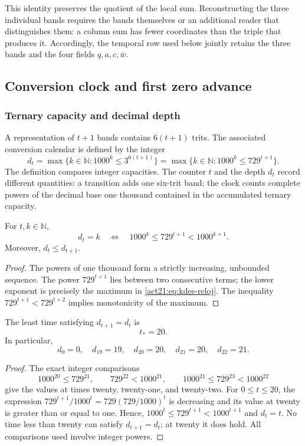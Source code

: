 This identity preserves the quotient of the local sum. Reconstructing
the three individual bands requires the bands themselves or an additional reader
that distinguishes them: a column sum has fewer coordinates
than the triple that produces it. Accordingly, the temporal row used below
jointly retains the three bands and the four fields
$q,a,c,\bar w$.

\subsection{Conversion clock and first zero advance}

\subsubsection{Ternary capacity and decimal depth}

A representation of $t+1$ bands contains $6(t+1)$ trits. The associated
conversion calendar is defined by the integer
\begin{equation}
 d_t=\max\{k\in\mathbb N:1000^k\leq3^{6(t+1)}\}
     =\max\{k\in\mathbb N:1000^k\leq729^{t+1}\}.
 \label{act21:eq:kdes-reloj}
\end{equation}
The definition compares integer capacities. The counter $t$ and the
depth $d_t$ record different quantities: a transition adds
one six-trit band; the clock counts complete powers of the
decimal base one thousand contained in the accumulated ternary capacity.

\begin{lemma}
For $t,k\in\mathbb N$,
\[
 d_t=k\quad\Longleftrightarrow\quad
 1000^k\leq729^{t+1}<1000^{k+1}.
\]
Moreover, $d_t\leq d_{t+1}$.
\end{lemma}
\begin{proof}
The powers of one thousand form a strictly increasing, unbounded
sequence. The power $729^{t+1}$ lies between two consecutive terms;
the lower exponent is precisely the maximum in
\eqref{act21:eq:kdes-reloj}. The inequality
$729^{t+1}<729^{t+2}$ implies monotonicity of the maximum.
\end{proof}

\begin{proposition}
The least time satisfying $d_{t+1}=d_t$ is
\[
 t_*=20.
\]
In particular,
\[
 d_0=0,\quad d_{19}=19,\quad d_{20}=20,
 \quad d_{21}=20,\quad d_{22}=21.
\]
\end{proposition}
\begin{proof}
The exact integer comparisons
\[
 1000^{20}\leq729^{21},\qquad
 729^{22}<1000^{21},\qquad
 1000^{21}\leq729^{23}<1000^{22}
\]
give the values at times twenty, twenty-one, and twenty-two. For
$0\leq t\leq20$, the expression
$729^{t+1}/1000^t=729(729/1000)^t$ is decreasing and its value at twenty
is greater than or equal to one. Hence,
$1000^t\leq729^{t+1}<1000^{t+1}$ and $d_t=t$. No time less than
twenty can satisfy $d_{t+1}=d_t$; at twenty it does hold.
All comparisons used involve integer powers.
\end{proof}

